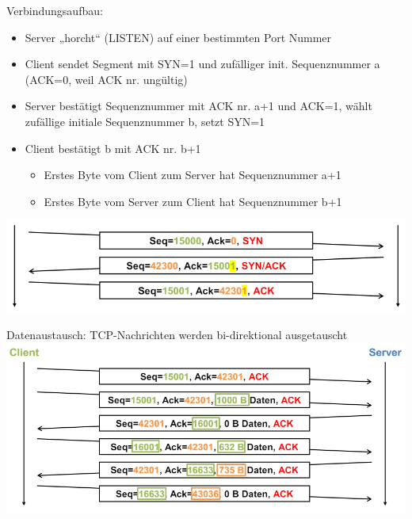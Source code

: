\begin{example}
    Verbindungsaufbau:
    \begin{itemize}
        \item Server „horcht“ (LISTEN) auf einer bestimmten Port Nummer
        \item Client sendet Segment mit SYN=1 und zufälliger init. Sequenznummer a (ACK=0, weil ACK nr. ungültig)
        \item Server bestätigt Sequenznummer mit ACK nr. a+1 und ACK=1, wählt zufällige initiale Sequenznummer b, setzt SYN=1
        \item Client bestätigt b mit ACK nr. b+1 
        \begin{itemize}
            \item Erstes Byte vom Client zum Server hat Sequenznummer a+1
            \item Erstes Byte vom Server zum Client hat Sequenznummer b+1
        \end{itemize}
    \end{itemize}
        \includegraphics[width=1\linewidth]{images/example_verbindungsaufbau_tcp.png}
\end{example}

\begin{example}
    Datenaustausch: TCP-Nachrichten werden bi-direktional ausgetauscht\\
        \includegraphics[width=1\linewidth]{images/tcp_datenaustausch_ex.png}
\end{example}

